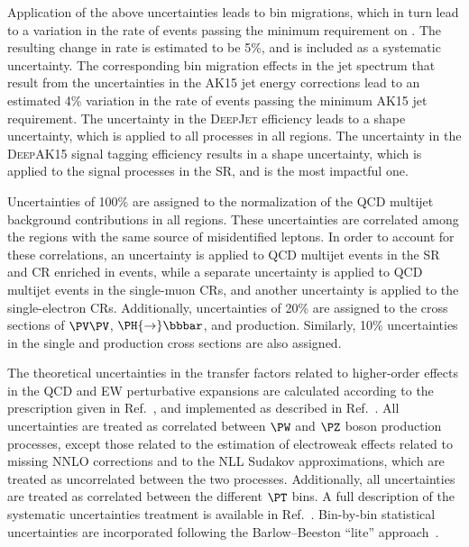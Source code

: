 Application of the above uncertainties leads to bin migrations, which in turn lead to a variation in the rate of events passing the minimum requirement on \recoil. The resulting change in rate is estimated to be 5\%, and is included as a systematic uncertainty. The corresponding bin migration effects in the jet \pt spectrum that result from the uncertainties in the AK15 jet energy corrections lead to an estimated 4\%  variation in the rate of events passing the minimum AK15 jet \pt requirement. The uncertainty in the \textsc{DeepJet} efficiency leads to a shape uncertainty, which is applied to all processes in all regions. 
The uncertainty in the \textsc{DeepAK15} signal tagging efficiency results in a shape uncertainty, which is applied to the signal processes in the SR, and is the most impactful one. 

Uncertainties of 100\% are assigned to the normalization of the QCD multijet background contributions in all regions. These uncertainties are correlated among the regions with the same source of misidentified leptons. In order to account for these correlations, an uncertainty is applied to QCD multijet events in the SR and CR enriched in \Zjets events, while a separate uncertainty is applied to QCD multijet events in the single-muon CRs, and another uncertainty is applied to the single-electron CRs. Additionally, uncertainties of 20\% are assigned to the cross sections of $\PV\PV$, $\PH {\to} \bbbar$, and \DYjets production. Similarly, 10\% uncertainties in the single \PQt and \ttbar production cross sections are also assigned. 

The theoretical uncertainties in the transfer factors related to higher-order effects in the QCD and EW perturbative expansions are calculated according to the prescription given in Ref.~\cite{DMTheory}, and implemented as described in Ref.~\cite{Sirunyan:2017jix}. 
All uncertainties are treated as correlated between $\PW$ and $\PZ$ boson production processes, except those related to the estimation of electroweak effects related to missing NNLO corrections and to the NLL Sudakov approximations, which are treated as uncorrelated between the two processes. 
Additionally, all uncertainties are treated as correlated between the different $\PT$ bins. 
A full description of the systematic uncertainties treatment is available in Ref.~\cite{Sirunyan:2017jix}.
Bin-by-bin statistical uncertainties are incorporated following the Barlow--Beeston ``lite'' approach~\cite{Conway:2011in}.

